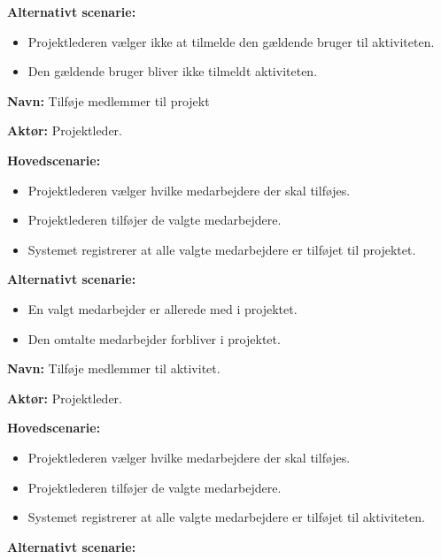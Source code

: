 \textbf{Alternativt scenarie:}

\begin{itemize}
    \item Projektlederen vælger ikke at tilmelde den gældende bruger til aktiviteten.
    
    \item Den gældende bruger bliver ikke tilmeldt aktiviteten.
\end{itemize}

\vspace{1 cm}

\textbf{Navn:} Tilføje medlemmer til projekt

\textbf{Aktør:} Projektleder.

\textbf{Hovedscenarie: }
    
\begin{itemize}
    \item Projektlederen vælger hvilke medarbejdere der skal tilføjes.
    \item Projektlederen tilføjer de valgte medarbejdere.
    \item Systemet registrerer at alle valgte medarbejdere er tilføjet til projektet.
\end{itemize}

\textbf{Alternativt scenarie:}

\begin{itemize}
    \item En valgt medarbejder er allerede med i projektet.
        \item Den omtalte medarbejder forbliver i projektet.
\end{itemize}

\vspace{1 cm}

\textbf{Navn:} Tilføje medlemmer til aktivitet.

\textbf{Aktør:} Projektleder.

\textbf{Hovedscenarie: }
    
\begin{itemize}
    \item Projektlederen vælger hvilke medarbejdere der skal tilføjes.
    \item Projektlederen tilføjer de valgte medarbejdere.
    \item Systemet registrerer at alle valgte medarbejdere er tilføjet til aktiviteten.
\end{itemize}

\textbf{Alternativt scenarie:}

